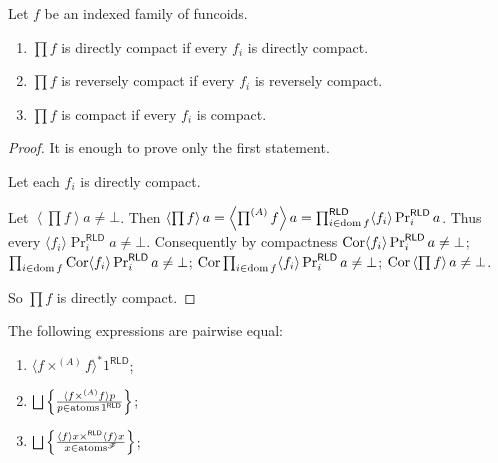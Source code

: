 \begin{thm}
Let $f$ be an indexed family of funcoids. 

\begin{enumerate}
  \item $\prod f$ is directly compact if every $f_i$ is directly compact.
  
  \item $\prod f$ is reversely compact if every $f_i$ is reversely compact.
  
  \item $\prod f$ is compact if every $f_i$ is compact.
\end{enumerate}
\end{thm}

\begin{proof}
  It is enough to prove only the first statement.
  
  Let each $f_i$ is directly compact.
  
  Let $\left\langle \prod f \right\rangle a \neq \bot$. Then $\left\langle \prod
  f \right\rangle a = \left\langle \prod^{(A)} f \right\rangle a =
  \prod^{\mathsf{RLD}}_{i \in \operatorname{dom} f} \langle f_i \rangle
  \Pr^{\mathsf{RLD}}_i a$. Thus every $\langle f_i \rangle
  \Pr^{\mathsf{RLD}}_i a \neq \bot$. Consequently by compactness
  $\operatorname{Cor} \langle f_i \rangle \Pr^{\mathsf{RLD}}_i a \neq \bot$;
  $\prod_{i \in \operatorname{dom} f} \operatorname{Cor} \langle f_i \rangle
  \Pr^{\mathsf{RLD}}_i a \neq \bot$; $\operatorname{Cor} \prod_{i \in \operatorname{dom}
  f} \langle f_i \rangle \Pr^{\mathsf{RLD}}_i a \neq \bot$; $\operatorname{Cor}
  \left\langle \prod f \right\rangle a \neq \bot$.
  
  So $\prod f$ is directly compact.
\end{proof}

\begin{prop}
  The following expressions are pairwise equal:
  \begin{enumerate}
    \item\label{ff-id-s} $\langle f \times^{(A)} f \rangle^{\ast} 1^{\mathsf{RLD}}$;
    
    \item\label{ff-id-at} $\bigsqcup \setcond{ \langle f \times^{(A)} f \rangle p }
    {p \in \atoms 1^{\mathsf{RLD}} }$;
    
    \item\label{ff-id-p} $\bigsqcup \setcond{ \supfun{f} x \times^{\mathsf{RLD}}
    \supfun{f} x }{ x \in \atoms^{\mathscr{F}} }$;
  \end{enumerate}
\end{prop}

